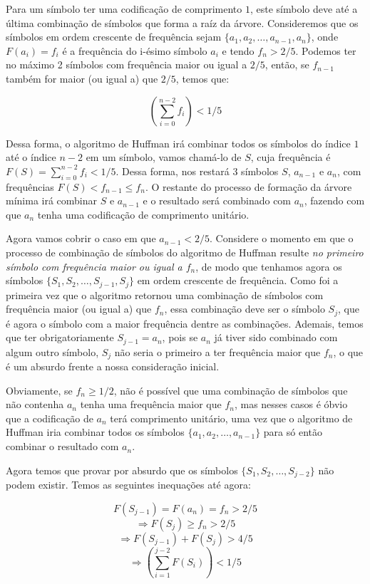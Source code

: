 \documentclass[12pt, a4paper]{article}
\begin{document}
Para um símbolo ter uma codificação de comprimento $1$, este símbolo deve  até a última combinação de símbolos que forma a raíz da árvore. Consideremos que os símbolos em ordem crescente de frequência sejam $\{a_1, a_2, \ldots, a_{n-1}, a_n\}$, onde $F(a_i)=f_i$ é a frequência do i-ésimo símbolo $a_i$ e tendo $f_n > 2/5$. Podemos ter no máximo 2 símbolos com frequência maior ou igual a $2/5$, então, se $f_{n-1}$ também for maior (ou igual a) que $2/5$, temos que:

\[ \left( \sum_{i=0}^{n-2} f_i \right) < 1/5\]

Dessa forma, o algoritmo de Huffman irá combinar todos os símbolos do índice $1$ até o índice $n-2$ em um  símbolo, vamos chamá-lo de $S$, cuja frequência é $F(S) = \sum_{i=0}^{n-2} f_i < 1/5$. Dessa forma, nos restará 3 símbolos $S$, $a_{n-1}$ e $a_n$, com frequências $F(S) < f_{n-1} \leq f_n$. O restante do processo de formação da árvore mínima irá combinar $S$ e $a_{n-1}$ e o resultado será combinado com $a_n$, fazendo com que $a_n$ tenha uma codificação de comprimento unitário.

Agora vamos cobrir o caso em que $a_{n-1} < 2/5$. Considere o momento em que o processo de combinação de símbolos do algoritmo de Huffman resulte \emph{no primeiro símbolo com frequência maior ou igual a $f_n$}, de modo que tenhamos agora os símbolos $\{S_1, S_2, \ldots, S_{j-1}, S_j\}$ em ordem crescente de frequência. Como foi a primeira vez que o algoritmo retornou uma combinação de símbolos com frequência maior (ou igual a) que $f_n$, essa combinação deve ser o símbolo $S_j$, que é agora o símbolo com a maior frequência dentre as combinações. Ademais, temos que ter obrigatoriamente $S_{j-1}=a_n$, pois se $a_n$ já tiver sido combinado com algum outro símbolo, $S_j$ não seria o primeiro a ter frequência maior que $f_n$, o que é um absurdo frente a nossa consideração inicial.

Obviamente, se $f_n \geq 1/2$, não é possível que uma combinação de símbolos que não contenha $a_n$ tenha uma frequência maior que $f_n$, mas nesses casos é óbvio que a codificação de $a_n$ terá comprimento unitário, uma vez que o algoritmo de Huffman iria combinar todos os símbolos $\{a_1, a_2, \ldots, a_{n-1} \}$ para só então combinar o resultado com $a_n$.

Agora temos que provar por absurdo que os símbolos $\{ S_1, S_2, \ldots, S_{j-2} \}$ não podem existir. Temos as seguintes inequações até agora:

\[ F(S_{j-1}) = F(a_n) = f_n > 2/5 \]
\[ \Rightarrow F(S_j) \geq f_n > 2/5 \]
\[ \Rightarrow F(S_{j-1}) + F(S_j) > 4/5 \]
\[ \Rightarrow \left( \sum_{i=1}^{j-2} F(S_i) \right) < 1/5 \]
\end{document}
